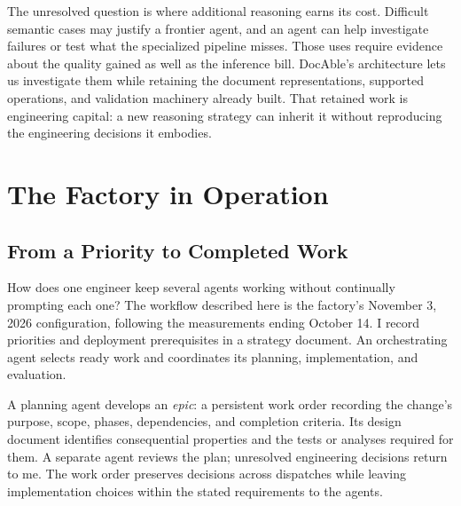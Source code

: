 The unresolved question is where additional reasoning earns its cost. Difficult semantic cases may justify a frontier agent, and an agent can help investigate failures or test what the specialized pipeline misses. Those uses require evidence about the quality gained as well as the inference bill. DocAble's architecture lets us investigate them while retaining the document representations, supported operations, and validation machinery already built. That retained work is engineering capital: a new reasoning strategy can inherit it without reproducing the engineering decisions it embodies.

\section{The Factory in Operation}\label{heading:the-factory-in-operation}


\subsection{From a Priority to Completed Work}\label{heading:from-a-priority-to-completed-work}


How does one engineer keep several agents working without continually prompting each one? The workflow described here is the factory's November 3, 2026 configuration, following the measurements ending October 14. I record priorities and deployment prerequisites in a strategy document. An orchestrating agent selects ready work and coordinates its planning, implementation, and evaluation.

A planning agent develops an \emph{epic}: a persistent work order recording the change's purpose, scope, phases, dependencies, and completion criteria. Its design document identifies consequential properties and the tests or analyses required for them. A separate agent reviews the plan; unresolved engineering decisions return to me. The work order preserves decisions across dispatches while leaving implementation choices within the stated requirements to the agents.


